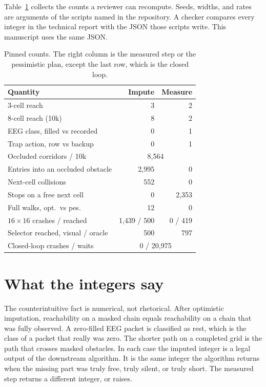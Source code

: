 \documentclass[10pt,twocolumn,letterpaper]{article}
\begin{document}
Table~\ref{tab:pin} collects the counts a reviewer can recompute.
Seeds, widths, and rates are arguments of the scripts named in the repository.
A checker compares every integer in the technical report with the JSON those scripts write.
This manuscript uses the same JSON.

\begin{table}[t]
  \centering
  \small
  \setlength{\tabcolsep}{3pt}
  \begin{tabular}{lrr}
    \toprule
    Quantity & Impute & Measure \\
    \midrule
    3-cell reach & 3 & 2 \\
    8-cell reach (10k) & 8 & 2 \\
    EEG class, filled vs recorded & 0 & 1 \\
    Trap action, row vs backup & 0 & 1 \\
    Occluded corridors / 10k & \multicolumn{2}{c}{8{,}564} \\
    Entries into an occluded obstacle & 2{,}995 & 0 \\
    Next-cell collisions & 552 & 0 \\
    Stops on a free next cell & 0 & 2{,}353 \\
    Full walks, opt.\ vs pes. & 12 & 0 \\
    $16{\times}16$ crashes / reached & 1{,}439 / 500 & 0 / 419 \\
    Selector reached, visual / oracle & 500 & 797 \\
    Closed-loop crashes / waits & \multicolumn{2}{c}{0 / 20{,}975} \\
    \bottomrule
  \end{tabular}
  \caption{Pinned counts. The right column is the measured step or the pessimistic plan, except the last row, which is the closed loop.}
  \label{tab:pin}
\end{table}

\section{What the integers say}

The counterintuitive fact is numerical, not rhetorical.
After optimistic imputation, reachability on a masked chain equals reachability on a chain that was fully observed.
A zero-filled EEG packet is classified as rest, which is the class of a packet that really was zero.
The shorter path on a completed grid is the path that crosses masked obstacles.
In each case the imputed integer is a legal output of the downstream algorithm.
It is the same integer the algorithm returns when the missing part was truly free, truly silent, or truly short.
The measured step returns a different integer, or raises.
\end{document}
